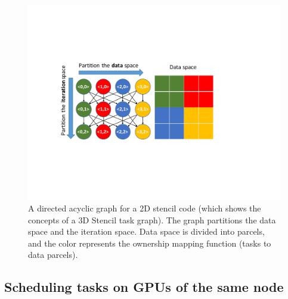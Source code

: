\begin{figure}[htb]
\centering
\includegraphics[width=.47\textwidth]{figures/taskGraph.pdf}
\caption{A directed acyclic graph for a 2D stencil code (which shows the concepts of a 3D Stencil task graph). The graph partitions the data space and the iteration space. Data space is divided into parcels, and the color represents the ownership mapping function (tasks to data parcels).}
\label{fig:taskGraph}
\end{figure}


\subsection{Scheduling tasks on GPUs of the same node}


